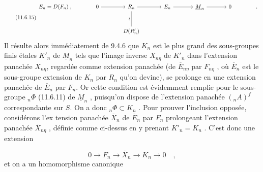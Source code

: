 \begin{equation}\tag{11.6.15}
\begin{tikzcd}[column sep=large, row sep=large]
E_n = D(F_n) \; , & 0 \arrow[r] & R_n \arrow[r] \arrow[d, dash, "\wr"'] & E_n \arrow[r] & \underline{M}_n \arrow[r] & 0 & . \\
& & D(R'_n) & & & &
\end{tikzcd}
\end{equation}
Il résulte alors immédiatement de 9.4.6 que $K_n$ est le plus grand des sous-groupes finis étales $K'_n$ de $\underline{M}_n$ tels que l'image inverse $\overline{X}_{n\eta}$ de $K'_n$ dans l'extension panachée $X_{n\eta}$, regardée comme extension panachée (de $\overline{E}_{n\eta}$ par $F_{n\eta}$ , où $\overline{E}_n$ est le sous-groupe extension de $K_n$ par $R_n$ qu'on devine), se prolonge en une extension panachée de $\overline{E}_n$ par $F_n$. Or cette condition est évidemment remplie pour le sous-groupe ${}_n\Phi$ (11.6.11) de $\underline{M}_n$ , puisqu'on dispose de l'extension panachée $({}_nA)^f$ correspondante sur $S$. On a donc ${}_n\Phi \subset K_n$ . Pour prouver l'inclusion opposée, considérons l'ex%
tension panachée $\overline{X}_n$ de $\overline{E}_n$ par $F_n$ prolongeant l'extension panachée $\overline{X}_{n\eta}$ , définie comme ci-dessus en y prenant $K'_n = K_n$ . C'est donc une extension

\begin{equation*}
0 \longrightarrow F_n \longrightarrow \overline{X}_n \longrightarrow K_n \longrightarrow 0 \quad ,
\end{equation*}
et on a un homomorphisme canonique

